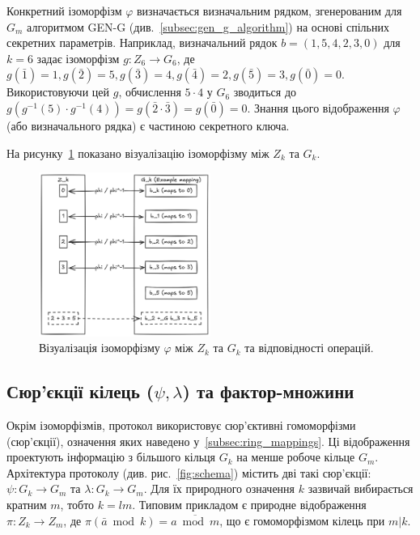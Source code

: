 Конкретний ізоморфізм $\varphi$ визначається визначальним рядком, згенерованим для $G_m$ алгоритмом GEN-G (див.~\ref{subsec:gen_g_algorithm}) на основі спільних секретних параметрів.
Наприклад, визначальний рядок $b=(1, 5, 4, 2, 3, 0)$ для $k=6$ задає ізоморфізм $g: Z_6 \to G_6$, де $g(\bar{1})=1, g(\bar{2})=5, g(\bar{3})=4, g(\bar{4})=2, g(\bar{5})=3, g(\bar{0})=0$.
Використовуючи цей $g$, обчислення $5 \cdot 4$ у $G_6$ зводиться до $g(g^{-1}(5) \cdot g^{-1}(4)) = g(\bar{2} \cdot \bar{3}) = g(\bar{0}) = 0$.
Знання цього відображення $\varphi$ (або визначального рядка) є частиною секретного ключа.

На рисунку~\ref{fig:gk_zk_iso} показано візуалізацію ізоморфізму між $Z_k$ та $G_k$.
\begin{figure}[ht]
    \centering
    \includegraphics[width=0.5\textwidth]{pictures/G_k vs Z_k Isomorphism Example}
    \caption{Візуалізація ізоморфізму $\varphi$ між $Z_k$ та $G_k$ та відповідності операцій.}
    \label{fig:gk_zk_iso}
\end{figure}

\subsection{Сюр'єкції кілець ($\psi, \lambda$) та фактор-множини}
\label{subsec:ring_surjection}
Окрім ізоморфізмів, протокол використовує сюр'єктивні гомоморфізми (сюр'єкції), означення яких наведено у~\ref{subsec:ring_mappings}.
Ці відображення проектують інформацію з більшого кільця $G_k$ на менше робоче кільце $G_m$.
Архітектура протоколу (див. рис.~\ref{fig:schema}) містить дві такі сюр'єкції: $\psi: G_k \to G_m$ та $\lambda: G_k \to G_m$.
Для їх природного означення $k$ зазвичай вибирається кратним $m$, тобто $k=lm$.
Типовим прикладом є природне відображення $\pi: Z_k \to Z_m$, де $\pi(\bar{a} \bmod k) = \overline{a \bmod m}$, що є гомоморфізмом кілець при $m|k$.

